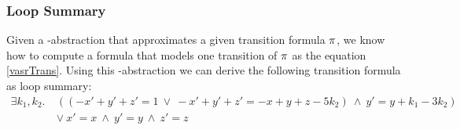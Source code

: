 \subsubsection{\qvasr Loop Summary}
Given a \qvasr-abstraction that approximates a given transition formula $\pi$, we know how to compute a formula that models one transition of $\pi$ as the equation \ref{vasrTrans}.
Using this \qvasr-abstraction we can derive the following transition formula as loop summary:
\begin{align*}
	\exists k_1, k_2.\ &((-x' + y' + z' = 1\ \lor\ -x' + y' + z' = -x + y + z - 5k_2)\ \land\ y' = y + k_1 - 3k_2)\ \\ &\lor\ x' = x\ \land\ y' = y\ \land\ z' = z
\end{align*}
